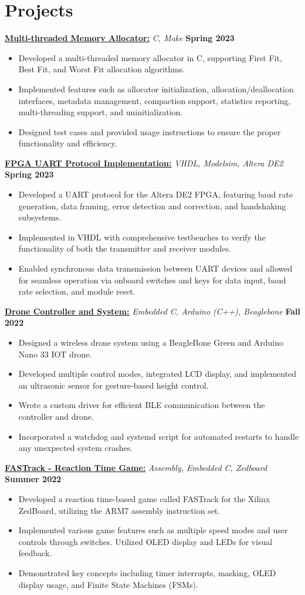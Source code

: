 \documentclass[letterpaper,11pt]{article}
\newcommand{\Item} [1] {
    \item\small{{#1 \vspace{-2pt}}}
}
\newcommand{\resumeItemListStart} [0] {
    \vspace{3pt}
    \begin{itemize}[leftmargin=*,topsep=0pt,itemsep=-2pt]
}
\newcommand{\resumeItemListEnd} [0] {
    \end{itemize}
    \vspace{3pt}
}
\begin{document}
    \section{Projects}
    \href{https://github.com/SatireSage/Multi-threaded-Memory-Allocator}{\underline{\textbf{Multi-threaded Memory Allocator:}}} {\sl C, Make\/} \hfill \textbf{Spring 2023}
    \resumeItemListStart{}
        \Item{Developed a multi-threaded memory allocator in C, supporting First Fit, Best Fit, and Worst Fit allocation algorithms.}
        \Item{Implemented features such as allocator initialization, allocation/deallocation interfaces, metadata management, compaction support, statistics reporting, multi-threading support, and uninitialization.}
        \Item{Designed test cases and provided usage instructions to ensure the proper functionality and efficiency.}
    \resumeItemListEnd{}
    \href{https://github.com/SatireSage/FPGA-UART-Protocol}{\underline{\textbf{FPGA UART Protocol Implementation:}}} {\sl VHDL, Modelsim, Altera DE2\/} \hfill \textbf{Spring 2023}
    \resumeItemListStart{}
        \Item{Developed a UART protocol for the Altera DE2 FPGA, featuring baud rate generation, data framing, error detection and correction, and handshaking subsystems.}
        \Item{Implemented in VHDL with comprehensive testbenches to verify the functionality of both the transmitter and receiver modules.}
        \Item{Enabled synchronous data transmission between UART devices and allowed for seamless operation via onboard switches and keys for data input, baud rate selection, and module reset.}
    \resumeItemListEnd{}
    \href{https://github.com/SatireSage/Dronee}{\underline{\textbf{Drone Controller and System:}}} {\sl Embedded C, Arduino (C++), Beaglebone\/} \hfill \textbf{Fall 2022}
    \resumeItemListStart{}
        \Item{Designed a wireless drone system using a BeagleBone Green and Arduino Nano 33 IOT drone.}
        \Item{Developed multiple control modes, integrated LCD display, and implemented an ultrasonic sensor for gesture-based height control.}
        \Item{Wrote a custom driver for efficient BLE communication between the controller and drone.}
        \Item{Incorporated a watchdog and systemd script for automated restarts to handle any unexpected system crashes.}
    \resumeItemListEnd{}
    \href{https://github.com/SatireSage/FASTrack}{\underline{\textbf{FASTrack - Reaction Time Game:}}} {\sl Assembly, Embedded C, Zedboard\/} \hfill \textbf{Summer 2022}
    \resumeItemListStart{}
        \Item{Developed a reaction time-based game called FASTrack for the Xilinx ZedBoard, utilizing the ARM7 assembly instruction set.}
        \Item{Implemented various game features such as multiple speed modes and user controls through switches. Utilized OLED display and LEDs for visual feedback.}
        \Item{Demonstrated key concepts including timer interrupts, masking, OLED display usage, and Finite State Machines (FSMs).}
    \resumeItemListEnd{}
\end{document}
